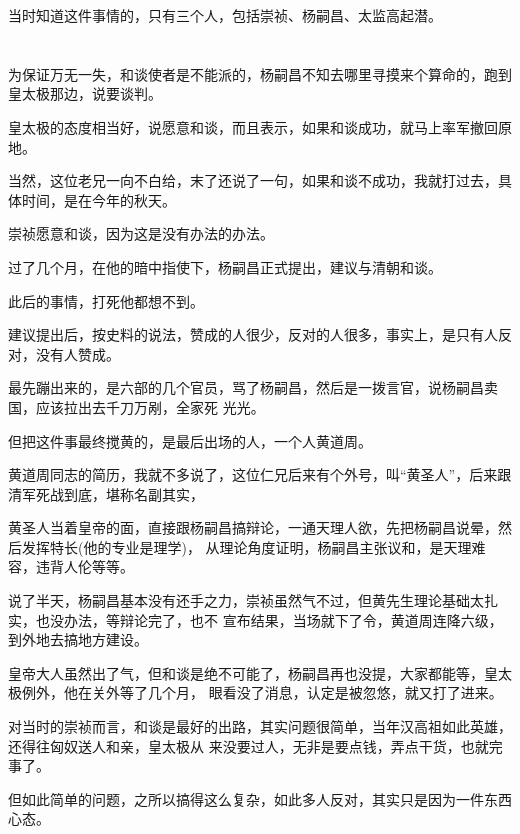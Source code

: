 \documentclass[11pt,a4paper,onecolumn]{article}
\begin{document}
当时知道这件事情的，只有三个人，包括崇祯、杨嗣昌、太监高起潜。

\section[\thesection]{}

为保证万无一失，和谈使者是不能派的，杨嗣昌不知去哪里寻摸来个算命的，跑到皇太极那边，说要谈判。

皇太极的态度相当好，说愿意和谈，而且表示，如果和谈成功，就马上率军撤回原地。

当然，这位老兄一向不白给，末了还说了一句，如果和谈不成功，我就打过去，具体时间，是在今年的秋天。

崇祯愿意和谈，因为这是没有办法的办法。

过了几个月，在他的暗中指使下，杨嗣昌正式提出，建议与清朝和谈。

此后的事情，打死他都想不到。

建议提出后，按史料的说法，赞成的人很少，反对的人很多，事实上，是只有人反对，没有人赞成。

最先蹦出来的，是六部的几个官员，骂了杨嗣昌，然后是一拨言官，说杨嗣昌卖国，应该拉出去千刀万剐，全家死
光光。

但把这件事最终搅黄的，是最后出场的人，一个人\myrule 黄道周。

黄道周同志的简历，我就不多说了，这位仁兄后来有个外号，叫``黄圣人''，后来跟清军死战到底，堪称名副其实，

黄圣人当着皇帝的面，直接跟杨嗣昌搞辩论，一通天理人欲，先把杨嗣昌说晕，然后发挥特长(他的专业是理学)，
从理论角度证明，杨嗣昌主张议和，是天理难容，违背人伦等等。

说了半天，杨嗣昌基本没有还手之力，崇祯虽然气不过，但黄先生理论基础太扎实，也没办法，等辩论完了，也不
宣布结果，当场就下了令，黄道周连降六级，到外地去搞地方建设。

皇帝大人虽然出了气，但和谈是绝不可能了，杨嗣昌再也没提，大家都能等，皇太极例外，他在关外等了几个月，
眼看没了消息，认定是被忽悠，就又打了进来。

对当时的崇祯而言，和谈是最好的出路，其实问题很简单，当年汉高祖如此英雄，还得往匈奴送人和亲，皇太极从
来没要过人，无非是要点钱，弄点干货，也就完事了。

但如此简单的问题，之所以搞得这么复杂，如此多人反对，其实只是因为一件东西\myrule 心态。

\section[\thesection]{}
\end{document}
